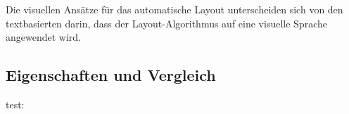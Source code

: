 Die visuellen Ansätze für das automatische Layout unterscheiden sich von den textbasierten darin, dass der Layout-Algorithmus auf eine visuelle Sprache angewendet wird.





\subsection{Eigenschaften und Vergleich}

test: \cite{Fowler03UML-as-Sketch}
